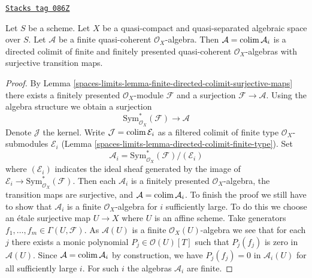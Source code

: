 \begin{lemma}
\label{spaces-limits-lemma-finite-algebra-directed-colimit-finite-finitely-presented}
\href{https://stacks.math.columbia.edu/tag/086Z}{\texttt{Stacks tag 086Z}}

Let $S$ be a scheme. Let $X$ be a quasi-compact and quasi-separated
algebraic space over $S$. Let $\mathcal{A}$ be a finite quasi-coherent
$\mathcal{O}_X$-algebra. Then $\mathcal{A} = \operatorname{colim} \mathcal{A}_i$
is a directed colimit of finite and finitely presented quasi-coherent
$\mathcal{O}_X$-algebras with surjective transition maps.
\end{lemma}

\begin{proof}
By Lemma \ref{spaces-limits-lemma-finite-directed-colimit-surjective-maps}
there exists a finitely presented $\mathcal{O}_X$-module
$\mathcal{F}$ and a surjection $\mathcal{F} \to \mathcal{A}$.
Using the algebra structure we obtain a surjection
$$
\text{Sym}^*_{\mathcal{O}_X}(\mathcal{F}) \longrightarrow \mathcal{A}
$$
Denote $\mathcal{J}$ the kernel. Write $\mathcal{J} = \operatorname{colim} \mathcal{E}_i$
as a filtered colimit of finite type $\mathcal{O}_X$-submodules
$\mathcal{E}_i$ (Lemma \ref{spaces-limits-lemma-directed-colimit-finite-type}). Set
$$
\mathcal{A}_i = \text{Sym}^*_{\mathcal{O}_X}(\mathcal{F})/(\mathcal{E}_i)
$$
where $(\mathcal{E}_i)$ indicates the ideal sheaf generated by
the image of $\mathcal{E}_i \to \text{Sym}^*_{\mathcal{O}_X}(\mathcal{F})$.
Then each $\mathcal{A}_i$ is a finitely presented $\mathcal{O}_X$-algebra,
the transition maps are surjective, and $\mathcal{A} = \operatorname{colim} \mathcal{A}_i$.
To finish the proof we still
have to show that $\mathcal{A}_i$ is a finite $\mathcal{O}_X$-algebra
for $i$ sufficiently large. To do this we choose an \'etale surjective
map $U \to X$ where $U$ is an affine scheme. Take generators
$f_1, \ldots, f_m \in \Gamma(U, \mathcal{F})$.
As $\mathcal{A}(U)$ is a finite $\mathcal{O}_X(U)$-algebra we
see that for each $j$ there exists a monic polynomial
$P_j \in \mathcal{O}(U)[T]$ such that $P_j(f_j)$ is zero in $\mathcal{A}(U)$.
Since $\mathcal{A} = \operatorname{colim} \mathcal{A}_i$ by construction, we
have $P_j(f_j) = 0$ in $\mathcal{A}_i(U)$ for all sufficiently large $i$.
For such $i$ the algebras $\mathcal{A}_i$ are finite.
\end{proof}

